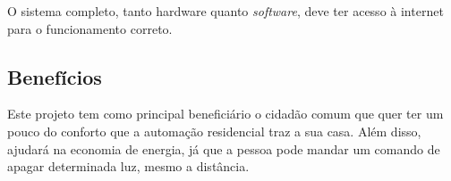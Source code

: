 \documentclass[12pt,journal,compsoc]{IEEEtran}
\begin{document}
O sistema completo, tanto hardware quanto \textit{software}, deve ter acesso à internet para o funcionamento correto.

\subsection{Benefícios}

Este projeto tem como principal beneficiário o cidadão comum que quer ter um pouco do conforto que a automação residencial traz a sua casa. Além disso, ajudará na economia de energia, já que a pessoa pode mandar um comando de apagar determinada luz, mesmo a distância.



\end{document}
